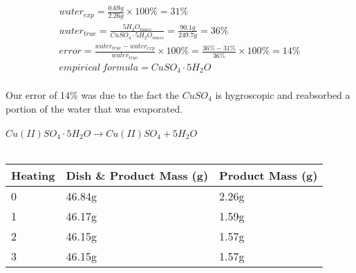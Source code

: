 \documentclass{article}
\begin{document}
\begin{gather}
    water_{exp} = \frac{0.69g}{2.26g} \times 100\% = 31\% \\
    water_{true} = \frac{5H_2O_{mass}}{CuSO_4\cdot5H_2O_{mass}} = \frac{90.1g}{249.7g} = 36\% \\
    error = \frac{water_{true} - water_{exp}}{water_{true}} \times 100\% = \frac{36\% - 31\%}{36\%} \times 100\% = 14\% \\
    empirical\ formula = CuSO_4\cdot5H_2O
\end{gather}
\\
Our error of 14\% was due to the fact the \(CuSO_4\) is hygroscopic and reabsorbed a portion of the water that was evaporated.
\\\\
\(Cu(II)SO_4\cdot5H_2O \to Cu(II)SO_4 + 5H_2O\)
\\\\
\centering
\begin{tabular}{p{1.5cm}|p{4cm}|p{3cm}}
    \toprule
    Heating & Dish \& Product Mass (g) & Product Mass (g) \\
    \midrule
    0 & 46.84g & 2.26g \\
    1 & 46.17g & 1.59g \\
    2 & 46.15g & 1.57g \\
    3 & 46.15g & 1.57g \\
\end{tabular}
\end{document}
